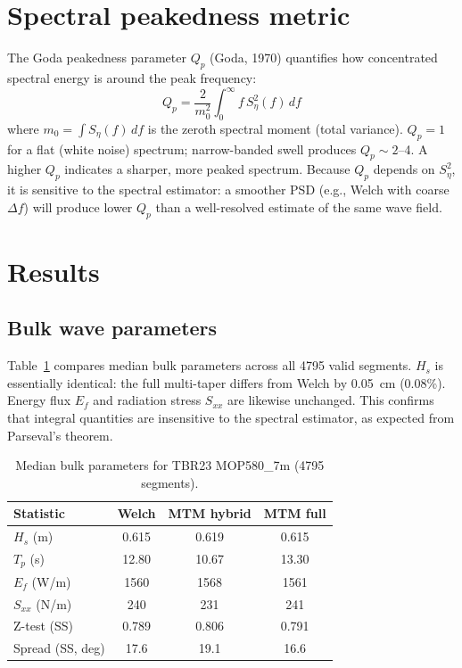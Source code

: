 \documentclass[11pt]{article}
\begin{document}
\section{Spectral peakedness metric}

The Goda peakedness parameter $Q_p$ (Goda, 1970) quantifies how
concentrated spectral energy is around the peak frequency:
\begin{equation}
  Q_p = \frac{2}{m_0^2} \int_0^\infty f \, S_\eta^2(f) \, df
\end{equation}
where $m_0 = \int S_\eta(f)\,df$ is the zeroth spectral moment (total
variance). $Q_p = 1$ for a flat (white noise) spectrum; narrow-banded
swell produces $Q_p \sim 2$--4. A higher $Q_p$ indicates a sharper,
more peaked spectrum. Because $Q_p$ depends on $S_\eta^2$, it is
sensitive to the spectral estimator: a smoother PSD (e.g., Welch with
coarse $\Delta f$) will produce lower $Q_p$ than a well-resolved
estimate of the same wave field.

\section{Results}

\subsection{Bulk wave parameters}

Table~\ref{tab:summary} compares median bulk parameters across all
4795 valid segments. $H_s$ is essentially identical: the full
multi-taper differs from Welch by 0.05~cm (0.08\%). Energy flux
$E_f$ and radiation stress $S_{xx}$ are likewise unchanged. This
confirms that integral quantities are insensitive to the spectral
estimator, as expected from Parseval's theorem.

\begin{table}[htbp]
  \centering
  \caption{Median bulk parameters for TBR23 MOP580\_7m (4795 segments).}
  \label{tab:summary}
  \begin{tabular}{@{}lccc@{}}
    \toprule
    Statistic & Welch & MTM hybrid & MTM full \\
    \midrule
    $H_s$ (m)             & 0.615 & 0.619 & 0.615 \\
    $T_p$ (s)             & 12.80 & 10.67 & 13.30 \\
    $E_f$ (W/m)           & 1560  & 1568  & 1561  \\
    $S_{xx}$ (N/m)        & 240   & 231   & 241   \\
    Z-test (SS)           & 0.789 & 0.806 & 0.791 \\
    Spread (SS, deg)      & 17.6  & 19.1  & 16.6  \\
    \bottomrule
  \end{tabular}
\end{table}
\end{document}

